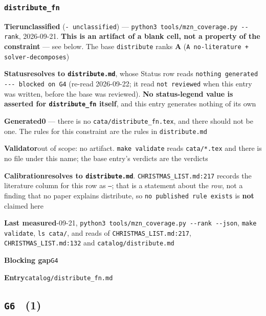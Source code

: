 \documentclass[10pt,a4paper]{article}
\newcommand{\entryfield}[2]{{\raggedright\textbf{#1}\quad #2\par}}
\begin{document}
\subsubsection*{\texttt{distribute\_\allowbreak{}fn}}
\label{entry:distribute-fn}
\entryfield{Tier}{\textbf{unclassified} (\texttt{- unclassified}) --- \texttt{python3 tools/\allowbreak{}mzn\_\allowbreak{}coverage.\allowbreak{}py -\allowbreak{}-\allowbreak{}rank}, 2026-09-21. \textbf{This is an artifact of a blank cell, not a property of the constraint} --- see below. The base \texttt{distribute} ranks \textbf{A} (\texttt{A no-\allowbreak{}literature + solver-\allowbreak{}decomposes})}
\entryfield{Status}{\textbf{resolves to \texttt{distribute.md}}, whose Status row reads \texttt{nothing generated -\allowbreak{}-\allowbreak{}-\allowbreak{} blocked on G4} (re-read 2026-09-22; it read \texttt{not reviewed} when this entry was written, before the base was reviewed). \textbf{No status-legend value is asserted for \texttt{distribute\_fn} itself}, and this entry generates nothing of its own}
\entryfield{Generated}{\textbf{0} --- there is no \texttt{cata/distribute\_fn.tex}, and there should not be one. The rules for this constraint are the rules in \texttt{distribute.md}}
\entryfield{Validator}{out of scope: no artifact. \texttt{make validate} reads \texttt{cata/*.tex} and there is no file under this name; the base entry's verdicts are the verdicts}
\entryfield{Calibration}{\textbf{resolves to \texttt{distribute.md}}. \texttt{CHRISTMAS\_LIST.md:217} records the literature column for this row as \texttt{---}; that is a statement about the \emph{row}, not a finding that no paper explains distribute, so \texttt{no published rule exists} is \textbf{not} claimed here}
\entryfield{Last measured}{2026-09-21, \texttt{python3 tools/\allowbreak{}mzn\_\allowbreak{}coverage.\allowbreak{}py -\allowbreak{}-\allowbreak{}rank -\allowbreak{}-\allowbreak{}json}, \texttt{make validate}, \texttt{ls cata/}, and reads of \texttt{CHRISTMAS\_LIST.md:217}, \texttt{CHRISTMAS\_LIST.md:132} and \texttt{catalog/distribute.md}}
\entryfield{Blocking gap}{\texttt{G4}}
\entryfield{Entry}{\texttt{catalog/distribute\_fn.md}}
\subsection*{\texttt{G6} \ \normalsize(1)}
\end{document}
